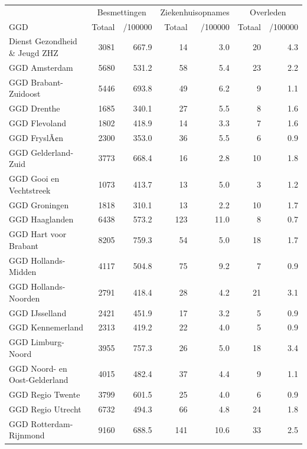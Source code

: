 \documentclass[
  english,
  man,floatsintext]{apa6}
\begin{document}
\begin{table}
\centering\begingroup\fontsize{10}{12}\selectfont

\begin{threeparttable}
\begin{tabular}{lrrrrrr}
\toprule
\multicolumn{1}{c}{ } & \multicolumn{2}{c}{Besmettingen} & \multicolumn{2}{c}{Ziekenhuisopnames} & \multicolumn{2}{c}{Overleden} \\
\cmidrule(l{3pt}r{3pt}){2-3} \cmidrule(l{3pt}r{3pt}){4-5} \cmidrule(l{3pt}r{3pt}){6-7}
GGD & Totaal & /100000 & Totaal & /100000 & Totaal & /100000\\
\midrule
Dienst Gezondheid \& Jeugd ZHZ & 3081 & 667.9 & 14 & 3.0 & 20 & 4.3\\
GGD Amsterdam & 5680 & 531.2 & 58 & 5.4 & 23 & 2.2\\
GGD Brabant-Zuidoost & 5446 & 693.8 & 49 & 6.2 & 9 & 1.1\\
GGD Drenthe & 1685 & 340.1 & 27 & 5.5 & 8 & 1.6\\
GGD Flevoland & 1802 & 418.9 & 14 & 3.3 & 7 & 1.6\\
GGD FryslÃ¢n & 2300 & 353.0 & 36 & 5.5 & 6 & 0.9\\
GGD Gelderland-Zuid & 3773 & 668.4 & 16 & 2.8 & 10 & 1.8\\
GGD Gooi en Vechtstreek & 1073 & 413.7 & 13 & 5.0 & 3 & 1.2\\
GGD Groningen & 1818 & 310.1 & 13 & 2.2 & 10 & 1.7\\
GGD Haaglanden & 6438 & 573.2 & 123 & 11.0 & 8 & 0.7\\
GGD Hart voor Brabant & 8205 & 759.3 & 54 & 5.0 & 18 & 1.7\\
GGD Hollands-Midden & 4117 & 504.8 & 75 & 9.2 & 7 & 0.9\\
GGD Hollands-Noorden & 2791 & 418.4 & 28 & 4.2 & 21 & 3.1\\
GGD IJsselland & 2421 & 451.9 & 17 & 3.2 & 5 & 0.9\\
GGD Kennemerland & 2313 & 419.2 & 22 & 4.0 & 5 & 0.9\\
GGD Limburg-Noord & 3955 & 757.3 & 26 & 5.0 & 18 & 3.4\\
GGD Noord- en Oost-Gelderland & 4015 & 482.4 & 37 & 4.4 & 9 & 1.1\\
GGD Regio Twente & 3799 & 601.5 & 25 & 4.0 & 6 & 0.9\\
GGD Regio Utrecht & 6732 & 494.3 & 66 & 4.8 & 24 & 1.8\\
GGD Rotterdam-Rijnmond & 9160 & 688.5 & 141 & 10.6 & 33 & 2.5\\

\end{tabular}
\end{threeparttable}
\end{table}
\end{document}
